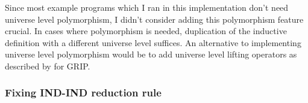 \documentclass{article}
\theoremstyle{definition}
\newcommand{\Gcode}[1]{{\color{OliveGreen}\textit{#1}}}
\newcommand{\Gcmath}[1]{{\color{OliveGreen}#1}}
\newcommand{\Gcsub}[2]{\Gcode{#1}\(\Gcmath{_{#2}}\)}
\begin{document}
%

Since most example programs which I ran in this implementation don't need
universe level polymorphism, I didn't consider adding this polymorphism feature
crucial. In cases where polymorphism is needed, duplication of the inductive
definition with a different universe level suffices. An alternative to
implementing universe level polymorphism would be to add universe level lifting
operators as described by \citet{maillard_reasonably_2022} for GRIP.

\subsubsection{Fixing IND-IND reduction rule}\label{sec:fix-ind-ind}
\end{document}
